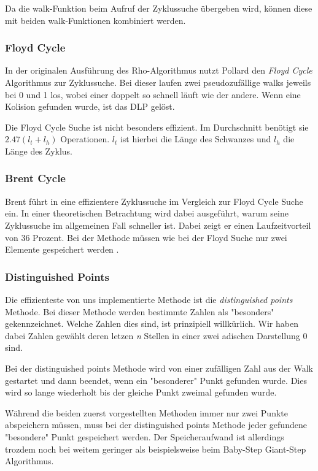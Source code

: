 \documentclass{scrartcl}
\begin{document}
Da die walk-Funktion beim Aufruf der Zyklussuche übergeben wird, können diese mit beiden walk-Funktionen kombiniert werden.

\subsubsection{Floyd Cycle}
\label{sec:floyd_cycle}
In der originalen Ausführung des Rho-Algorithmus nutzt Pollard
den \emph{Floyd Cycle} Algorithmus zur Zyklussuche.
Bei dieser laufen zwei pseudozufällige walks jeweils bei 0 und 1 los,
wobei einer doppelt so schnell läuft wie der andere.
Wenn eine Kolision gefunden wurde, ist das DLP gelöst.

Die Floyd Cycle Suche ist nicht besonders effizient.
Im Durchschnitt benötigt sie \( 2.47(l_t + l_h) \) Operationen.
\( l_t \) ist hierbei die Länge des Schwanzes und \( l_h \) die
Länge des Zyklus.
\cite{Galbraith2012}
\subsubsection{Brent Cycle}
\label{sec:brent_cycle}
Brent führt in \cite{Brent1980}  eine effizientere Zyklussuche im Vergleich zur Floyd Cycle Suche ein. In einer theoretischen Betrachtung wird dabei ausgeführt, warum seine Zyklussuche im allgemeinen Fall schneller ist.
Dabei zeigt er einen Laufzeitvorteil von 36 Prozent.
Bei der Methode müssen wie bei der Floyd Suche nur zwei Elemente gespeichert werden \cite{Galbraith2012}.
\subsubsection{Distinguished Points}
\label{sec:distinguished_points}
Die effizienteste von uns implementierte Methode ist die
\emph{distinguished points} Methode.
Bei dieser Methode werden bestimmte Zahlen als "besonders" gekennzeichnet.
Welche Zahlen dies sind, ist prinzipiell willkürlich.
Wir haben dabei Zahlen gewählt deren letzen \emph{n} Stellen in einer
zwei adischen Darstellung 0 sind.

Bei der distinguished points Methode wird von einer zufälligen Zahl aus
der Walk gestartet und dann beendet, wenn ein "besonderer" Punkt
gefunden wurde.
Dies wird so lange wiederholt bis der gleiche Punkt zweimal gefunden wurde.

Während die beiden zuerst vorgestellten Methoden immer nur zwei Punkte abspeichern müssen,
muss bei der distinguished points Methode jeder gefundene "besondere" Punkt gespeichert werden.
Der Speicheraufwand ist allerdings trozdem noch bei weitem geringer als beispielsweise beim
Baby-Step Giant-Step Algorithmus.
\cite{VanOorschot1999}
\end{document}
